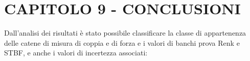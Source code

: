 \documentclass[a4paper, twoside]{article}
\begin{document}
\begin{table}[H]
    \centering
    \renewcommand{\arraystretch}{1.3}
    \caption{Componenti di incertezza e incertezza estesa per la catena di misura indiretta (F1-U3) sul banco prova STBF 2}
    \label{tab:incertezze_stbf_indiretta}
\end{table}



    \newpage

\section{CAPITOLO 9 - CONCLUSIONI}

Dall'analisi dei risultati è stato possibile classificare la classe di appartenenza delle catene di misura di coppia e di forza e i valori di banchi prova Renk e STBF, e anche i valori di incertezza associati:
\end{document}
